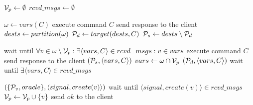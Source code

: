\begin{algorithm}[htbp!]
\footnotesize

\begin{distribalgo}[1]


\STATE $\mathcal{V}_p \leftarrow \emptyset$
\STATE $rcvd\_msgs \leftarrow \emptyset$
\ENDINDENT

	\STATE $\omega \leftarrow vars(C)$
		\STATE execute command $C$
		\STATE send response to the client
		\STATE $dests \leftarrow partition(\omega)$
		\STATE $\mathcal{P}_d \leftarrow target(dests, C)$
		\STATE $\mathcal{P}_s \leftarrow dests \setminus \mathcal{P}_d$

			\STATE wait until $\forall v \in \omega \setminus \mathcal{V}_p: \exists \langle vars, C \rangle \in rcvd\_msgs :v \in vars$
			\STATE execute command $C$
			\STATE send response to the client
			\STATE \rmcast$(\mathcal{P}_s, \langle vars, C\rangle)$
			\STATE $vars \leftarrow \omega \cap \mathcal{V}_p$
			\STATE \rmcast$(\mathcal{P}_d, \langle vars, C \rangle)$
			\STATE wait until $\exists \langle vars, C \rangle \in rcvd\_msgs$
		\ENDIF
	\ENDIF
\ENDINDENT

\vspace{1.0mm}

\vspace{1.0mm}
	\STATE \rmcast$(\{\mathcal{P}_v, oracle\}, \langle signal, create(v) \rangle)$
	\STATE wait until $\langle signal, create(v) \rangle \in rcvd\_msgs$
	\STATE $\mathcal{V}_p \leftarrow \mathcal{V}_p \cup \{v\}$
	\STATE send $ok$ to the client
\ENDINDENT


\end{distribalgo}
\end{algorithm}
